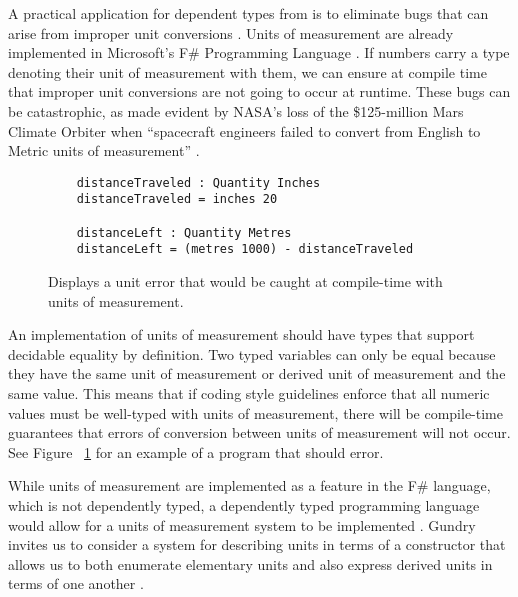 A practical application for dependent types from is to eliminate bugs that can
arise from improper unit conversions \cite{gundry2013}. Units of measurement are
already implemented in Microsoft's F\# Programming Language \cite{kennedy2009}.
If numbers carry a type denoting their unit of measurement with them, we can
ensure at compile time that improper unit conversions are not going to occur at
runtime. These bugs can be catastrophic, as made evident by NASA's loss of the
\$125-million Mars Climate Orbiter when ``spacecraft engineers failed to convert
from English to Metric units of measurement'' \cite{hotz1999}. 

\begin{figure}[ht!]
  \caption{Displays a unit error that would be caught at compile-time with units of measurement.}
  \label{unit_error}
  \begin{lstlisting}
    distanceTraveled : Quantity Inches
    distanceTraveled = inches 20

    distanceLeft : Quantity Metres
    distanceLeft = (metres 1000) - distanceTraveled
  \end{lstlisting}
\end{figure}

An implementation of units of measurement should have types that support
decidable equality by definition. Two typed variables can only be equal because
they have the same unit of measurement or derived unit of measurement and the
same value. This means that if coding style guidelines enforce that all numeric
values must be well-typed with units of measurement, there will be compile-time
guarantees that errors of conversion between units of measurement will not
occur. See Figure ~\ref{unit_error} for an example of a program that should
error. 

While units of measurement are implemented as a feature in the F\# language,
which is not dependently typed, a dependently typed programming language would
allow for a units of measurement system to be implemented \cite{gundry2013}.
Gundry invites us to consider a system for describing units in terms of a
constructor that allows us to both enumerate elementary units and also express
derived units in terms of one another \cite{gundry2013}. 


